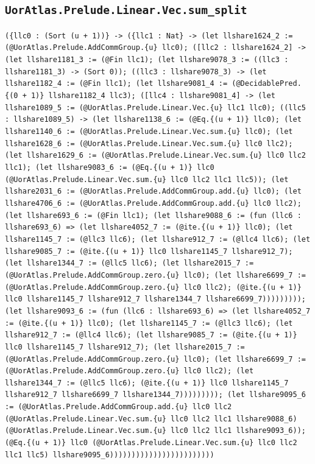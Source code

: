 \documentclass[11pt]{article}
\begin{document}
\subsection*{\texttt{UorAtlas.Prelude.Linear.Vec.sum\_split}}
\noindent\texttt{(\{llc0 : (Sort (u + 1))\} -> (\{llc1 : Nat\} -> (let llshare1624\_2 := (@UorAtlas.Prelude.AddCommGroup.\{u\} llc0); ([llc2 : llshare1624\_2] -> (let llshare1181\_3 := (@Fin llc1); (let llshare9078\_3 := ((llc3 : llshare1181\_3) -> (Sort 0)); ((llc3 : llshare9078\_3) -> (let llshare1182\_4 := (@Fin llc1); (let llshare9081\_4 := (@DecidablePred.\{(0 + 1)\} llshare1182\_4 llc3); ([llc4 : llshare9081\_4] -> (let llshare1089\_5 := (@UorAtlas.Prelude.Linear.Vec.\{u\} llc1 llc0); ((llc5 : llshare1089\_5) -> (let llshare1138\_6 := (@Eq.\{(u + 1)\} llc0); (let llshare1140\_6 := (@UorAtlas.Prelude.Linear.Vec.sum.\{u\} llc0); (let llshare1628\_6 := (@UorAtlas.Prelude.Linear.Vec.sum.\{u\} llc0 llc2); (let llshare1629\_6 := (@UorAtlas.Prelude.Linear.Vec.sum.\{u\} llc0 llc2 llc1); (let llshare9083\_6 := (@Eq.\{(u + 1)\} llc0 (@UorAtlas.Prelude.Linear.Vec.sum.\{u\} llc0 llc2 llc1 llc5)); (let llshare2031\_6 := (@UorAtlas.Prelude.AddCommGroup.add.\{u\} llc0); (let llshare4706\_6 := (@UorAtlas.Prelude.AddCommGroup.add.\{u\} llc0 llc2); (let llshare693\_6 := (@Fin llc1); (let llshare9088\_6 := (fun (llc6 : llshare693\_6) => (let llshare4052\_7 := (@ite.\{(u + 1)\} llc0); (let llshare1145\_7 := (@llc3 llc6); (let llshare912\_7 := (@llc4 llc6); (let llshare9085\_7 := (@ite.\{(u + 1)\} llc0 llshare1145\_7 llshare912\_7); (let llshare1344\_7 := (@llc5 llc6); (let llshare2015\_7 := (@UorAtlas.Prelude.AddCommGroup.zero.\{u\} llc0); (let llshare6699\_7 := (@UorAtlas.Prelude.AddCommGroup.zero.\{u\} llc0 llc2); (@ite.\{(u + 1)\} llc0 llshare1145\_7 llshare912\_7 llshare1344\_7 llshare6699\_7))))))))); (let llshare9093\_6 := (fun (llc6 : llshare693\_6) => (let llshare4052\_7 := (@ite.\{(u + 1)\} llc0); (let llshare1145\_7 := (@llc3 llc6); (let llshare912\_7 := (@llc4 llc6); (let llshare9085\_7 := (@ite.\{(u + 1)\} llc0 llshare1145\_7 llshare912\_7); (let llshare2015\_7 := (@UorAtlas.Prelude.AddCommGroup.zero.\{u\} llc0); (let llshare6699\_7 := (@UorAtlas.Prelude.AddCommGroup.zero.\{u\} llc0 llc2); (let llshare1344\_7 := (@llc5 llc6); (@ite.\{(u + 1)\} llc0 llshare1145\_7 llshare912\_7 llshare6699\_7 llshare1344\_7))))))))); (let llshare9095\_6 := (@UorAtlas.Prelude.AddCommGroup.add.\{u\} llc0 llc2 (@UorAtlas.Prelude.Linear.Vec.sum.\{u\} llc0 llc2 llc1 llshare9088\_6) (@UorAtlas.Prelude.Linear.Vec.sum.\{u\} llc0 llc2 llc1 llshare9093\_6)); (@Eq.\{(u + 1)\} llc0 (@UorAtlas.Prelude.Linear.Vec.sum.\{u\} llc0 llc2 llc1 llc5) llshare9095\_6))))))))))))))))))))))))}\par
\end{document}
